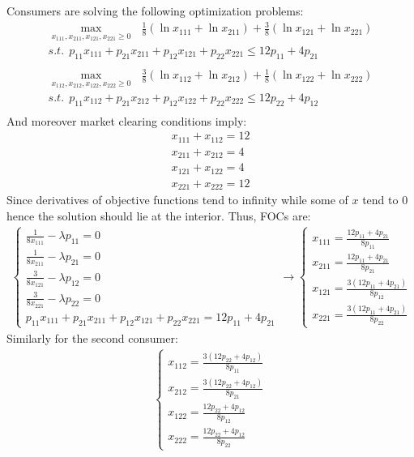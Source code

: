\documentclass[a4paper]{article}
\begin{document}
Consumers are solving the following optimization problems:
\begin{align*}
\underset{x_{111}, x_{211}, x_{121}, x_{221} \ge 0}{\max}\ \ \ \frac{1}{8} (\ln x_{111}+ \ln x_{211}) + \frac{3}{8}(\ln x_{121} + \ln x_{221})\\
s.t.\ \  p_{11}x_{111} + p_{21}x_{211} + p_{12}x_{121} + p_{22}x_{221} \le 12p_{11} + 4p_{21}\\
\\
\underset{x_{112}, x_{212}, x_{122}, x_{222} \ge 0}{\max}\ \ \ \frac{3}{8}(\ln x_{112} + \ln x_{212}) + \frac{1}{8}(\ln x_{122} + \ln x_{222})\\
s.t.\ \  p_{11}x_{112} + p_{21}x_{212} + p_{12}x_{122} + p_{22}x_{222} \le 12p_{22} + 4p_{12}\\
\end{align*}
And moreover market clearing conditions imply:
\begin{align*}
x_{111} + x_{112} = 12 \nonumber\\
x_{211} + x_{212} = 4\nonumber\\
x_{121} + x_{122} = 4\\
x_{221} + x_{222} = 12\nonumber
\end{align*}
Since derivatives of objective functions tend to infinity while some of $x$ tend to 0 hence the solution should lie at the interior. Thus, FOCs are:
\begin{align*}
\begin{cases}
\frac{1}{8x_{111}} - \lambda p_{11} = 0\\
\frac{1}{8x_{211}} - \lambda p_{21} = 0\\
\frac{3}{8x_{121}} - \lambda p_{12} = 0\\
\frac{3}{8x_{221}} - \lambda p_{22} = 0\\
p_{11}x_{111} + p_{21}x_{211} + p_{12}x_{121} + p_{22}x_{221} = 12p_{11} + 4p_{21}
\end{cases} \to \begin{cases}
x_{111} = \frac{12p_{11} + 4p_{21}}{8p_{11}}\\
x_{211} = \frac{12p_{11} + 4p_{21}}{8p_{21}}\\
x_{121} = \frac{3(12p_{11} + 4p_{21})}{8p_{12}}\\
x_{221} = \frac{3(12p_{11} + 4p_{21})}{8p_{22}}
\end{cases}
\end{align*}
Similarly for the second consumer:
\begin{align*}
\begin{cases}
x_{112} = \frac{3(12p_{22} + 4p_{12})}{8p_{11}}\\
x_{212} = \frac{3(12p_{22} + 4p_{12})}{8p_{21}}\\
x_{122} = \frac{12p_{22} + 4p_{12}}{8p_{12}}\\
x_{222} = \frac{12p_{22} + 4p_{12}}{8p_{22}}
\end{cases}
\end{align*}
\end{document}
